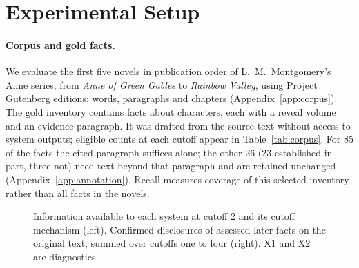 \section{Experimental Setup}
\label{sec:setup}

\paragraph{Corpus and gold facts.}
We evaluate the first five novels in publication order of L.~M.~Montgomery's Anne series,
from \emph{Anne of Green Gables} to \emph{Rainbow Valley}, using Project Gutenberg editions:
 words,  paragraphs and  chapters
(Appendix~\ref{app:corpus}).
The gold inventory contains  facts about  characters,
each with a reveal volume and an evidence paragraph. It was drafted from the source text
without access to system outputs; eligible counts at each cutoff appear in
Table~\ref{tab:corpus}.
\ifnwhuman For 85 of the  facts the cited paragraph suffices alone;
the other 26 (23 established in part, three not) need text beyond that paragraph and
are retained unchanged (Appendix~\ref{app:annotation}).\fi{}
Recall measures coverage of this selected inventory rather than all facts in the novels.

\begin{figure}[t]
\centering

\caption{Information available to each system at cutoff 2 and its cutoff mechanism (left).
Confirmed disclosures of assessed later facts on the original text, summed over cutoffs
one to four (right).
X1 and X2 are diagnostics.}
\label{fig:systems}
\end{figure}

